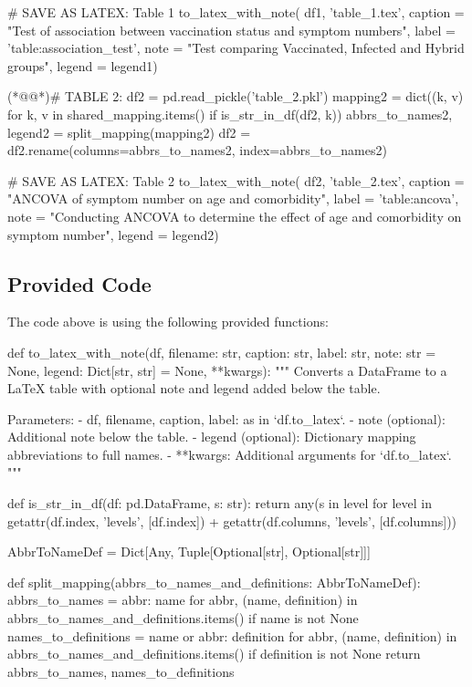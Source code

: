 \documentclass[11pt]{article}
\begin{document}
\begin{python}
# SAVE AS LATEX: Table 1
to_latex_with_note(
    df1, 'table_1.tex',
    caption = "Test of association between vaccination status and symptom numbers",
    label = 'table:association_test',
    note = "Test comparing Vaccinated, Infected and Hybrid groups",
    legend = legend1)

(*@@*)# TABLE 2:
df2 = pd.read_pickle('table_2.pkl')
mapping2 = dict((k, v) for k, v in shared_mapping.items() if is_str_in_df(df2, k))
abbrs_to_names2, legend2 = split_mapping(mapping2)
df2 = df2.rename(columns=abbrs_to_names2, index=abbrs_to_names2)

# SAVE AS LATEX: Table 2
to_latex_with_note(
    df2, 'table_2.tex',
    caption = "ANCOVA of symptom number on age and comorbidity",
    label = 'table:ancova',
    note = "Conducting ANCOVA to determine the effect of age and comorbidity on symptom number",
    legend = legend2)

\end{python}

\subsection{Provided Code}
The code above is using the following provided functions:

\begin{python}
def to_latex_with_note(df, filename: str, caption: str, label: str, note: str = None, legend: Dict[str, str] = None, **kwargs):
    """
    Converts a DataFrame to a LaTeX table with optional note and legend added below the table.

    Parameters:
    - df, filename, caption, label: as in `df.to_latex`.
    - note (optional): Additional note below the table.
    - legend (optional): Dictionary mapping abbreviations to full names.
    - **kwargs: Additional arguments for `df.to_latex`.
    """

def is_str_in_df(df: pd.DataFrame, s: str):
    return any(s in level for level in getattr(df.index, 'levels', [df.index]) + getattr(df.columns, 'levels', [df.columns]))

AbbrToNameDef = Dict[Any, Tuple[Optional[str], Optional[str]]]

def split_mapping(abbrs_to_names_and_definitions: AbbrToNameDef):
    abbrs_to_names = {abbr: name for abbr, (name, definition) in abbrs_to_names_and_definitions.items() if name is not None}
    names_to_definitions = {name or abbr: definition for abbr, (name, definition) in abbrs_to_names_and_definitions.items() if definition is not None}
    return abbrs_to_names, names_to_definitions

\end{python}
\end{document}
